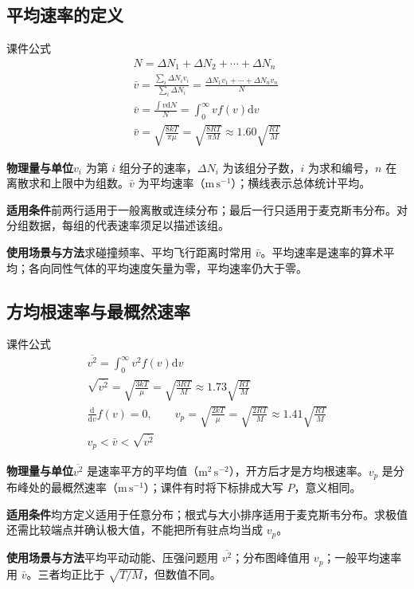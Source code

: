 \documentclass[UTF8,fontset=none,zihao=-4,a4paper]{ctexart}
\newcommand{\explain}[3]{\par\noindent\textbf{物理量与单位}\quad #1\par
\noindent\textbf{适用条件}\quad #2\par
\noindent\textbf{使用场景与方法}\quad #3\par}
\begin{document}
\par\noindent\begin{minipage}{\linewidth}
\subsection{平均速率的定义}
\begin{infobox}[breakable=false]{课件公式}
\begin{gather*}N=\Delta N_1+\Delta N_2+\cdots+\Delta N_n\\\bar v=\frac{\sum_i\Delta N_i v_i}{\sum_i\Delta N_i}=\frac{\Delta N_1v_1+\cdots+\Delta N_nv_n}{N}\\\bar v=\frac{\int v\mathrm dN}{N}=\int_0^\infty vf(v)\mathrm dv\\\bar v=\sqrt{\frac{8kT}{\pi\mu}}=\sqrt{\frac{8RT}{\pi M}}\approx1.60\sqrt{\frac{RT}{M}}\end{gather*}
\end{infobox}
\end{minipage}\par
\explain{$v_i$ 为第 $i$ 组分子的速率，$\Delta N_i$ 为该组分子数，$i$ 为求和编号，$n$ 在离散求和上限中为组数。$\bar v$ 为平均速率（$\mathrm{m\,s^{-1}}$）；横线表示总体统计平均。}{前两行适用于一般离散或连续分布；最后一行只适用于麦克斯韦分布。对分组数据，每组的代表速率须足以描述该组。}{求碰撞频率、平均飞行距离时常用 $\bar v$。平均速率是速率的算术平均；各向同性气体的平均速度矢量为零，平均速率仍大于零。}


\par\noindent\begin{minipage}{\linewidth}
\subsection{方均根速率与最概然速率}
\begin{infobox}[breakable=false]{课件公式}
\begin{gather*}\overline{v^2}=\int_0^\infty v^2f(v)\mathrm dv\\\sqrt{\overline{v^2}}=\sqrt{\frac{3kT}{\mu}}=\sqrt{\frac{3RT}{M}}\approx1.73\sqrt{\frac{RT}{M}}\\\frac{\mathrm d}{\mathrm dv}f(v)=0,\qquad v_p=\sqrt{\frac{2kT}{\mu}}=\sqrt{\frac{2RT}{M}}\approx1.41\sqrt{\frac{RT}{M}}\\v_p<\bar v<\sqrt{\overline{v^2}}\end{gather*}
\end{infobox}
\end{minipage}\par
\explain{$\overline{v^2}$ 是速率平方的平均值（$\mathrm{m^2\,s^{-2}}$），开方后才是方均根速率。$v_p$ 是分布峰处的最概然速率（$\mathrm{m\,s^{-1}}$）；课件有时将下标排成大写 $P$，意义相同。}{均方定义适用于任意分布；根式与大小排序适用于麦克斯韦分布。求极值还需比较端点并确认极大值，不能把所有驻点均当成 $v_p$。}{平均平动动能、压强问题用 $\overline{v^2}$；分布图峰值用 $v_p$；一般平均速率用 $\bar v$。三者均正比于 $\sqrt{T/M}$，但数值不同。}
\end{document}
